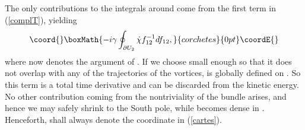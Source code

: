 \documentclass[a4paper,11pt]{article}
\begin{document}
The only contributions to the integrals around \coordHE{} come
from the first term in (\ref{complT}), yielding
\[\coord{}\boxMath{
-i\gamma\oint_{\partial{U_{2}}}\dot{\chi}f_{12}^{-1}df_{12},
}{corchetes}{0pt}\coordE{}\]
where now \myHighlight{$\chi$}\coordHE{} denotes the argument of 
\coordHE{}. If we choose \coordHE{} small
enough so that it does not overlap with any of the trajectories of the
vortices, \myHighlight{$\chi$}\coordHE{} is globally defined on \coordHE{}. So this term
is a total time derivative and can be discarded from the kinetic
energy.
No other contribution coming from the nontriviality of the bundle \coordHE{}
arises, and hence we may safely shrink \coordHE{} to the South pole, while 
\coordHE{} becomes dense in \myHighlight{$\Sigma$}\coordHE{}. Henceforth, \coordHE{} shall
always denote the coordinate in (\ref{cartes}).
\end{document}
